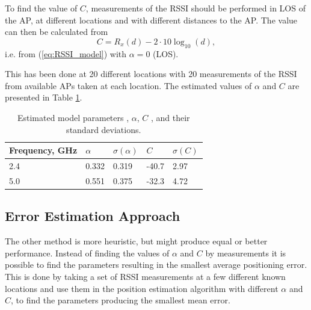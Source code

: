 \documentclass{LTHthesis}
\begin{document}
To find the value of $C$, measurements of the RSSI should be performed in LOS of the AP, at different locations and with different distances to the AP. The value can then be calculated from
%
\begin{equation}
C=R_x(d) - 2\cdot10\log_{10}(d),
\end{equation}
% 
i.e. from (\ref{eq:RSSI_model}) with $\alpha = 0$ (LOS).

This has been done at 20 different locations with 20 measurements of the RSSI from available APs taken at each location. The estimated values of $\alpha$ and $C$ are presented in Table \ref{table:est_par}.

\begin{table}[!hbt]
\begin{center}
\begin{tabular}{|l|l|l|l|l|}
\hline
\multicolumn{1}{|c|}{Frequency, GHz} & $\alpha$ & $\sigma(\alpha)$ & $C$ & $\sigma(C)$ \\
\hline
\hline
2.4 & 0.332 & 0.319 & -40.7 & 2.97 \\
5.0 & 0.551 & 0.375 & -32.3 & 4.72  \\
\hline
\end{tabular}
\end{center}
\caption{Estimated model parameters , $\alpha$, $C$ , and their standard deviations.}\label{table:est_par}
\end{table}
%
\subsection{Error Estimation Approach}
The other method is more heuristic, but might produce equal or better performance. Instead of finding the values of $\alpha$ and $C$ by measurements it is possible to find the parameters resulting in the smallest average positioning error. This is done by taking a set of RSSI measurements at a few different known locations and use them in the position estimation algorithm with different $\alpha$ and $C$, to find the parameters producing the smallest mean error.   
\end{document}
